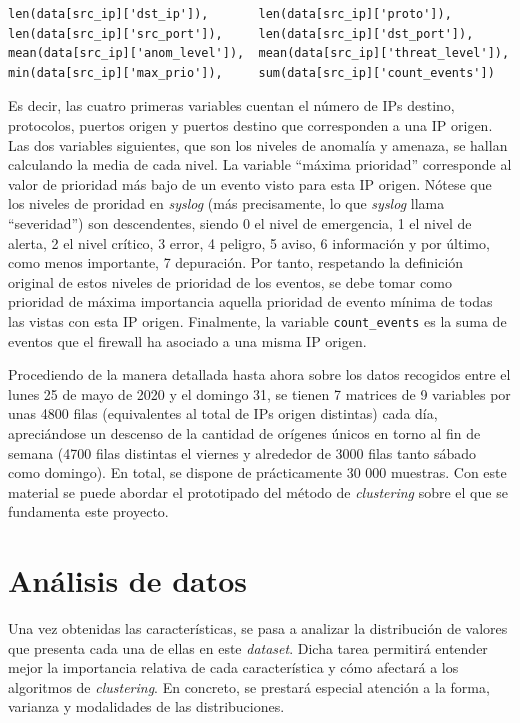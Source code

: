 \begin{verbatim}
len(data[src_ip]['dst_ip']),       len(data[src_ip]['proto']),
len(data[src_ip]['src_port']),     len(data[src_ip]['dst_port']),
mean(data[src_ip]['anom_level']),  mean(data[src_ip]['threat_level']),
min(data[src_ip]['max_prio']),     sum(data[src_ip]['count_events'])
\end{verbatim}

Es decir, las cuatro primeras variables cuentan el número de IPs destino, protocolos, puertos origen y puertos destino que corresponden a una IP origen.
Las dos variables siguientes, que son los niveles de anomalía y amenaza, se hallan calculando la media de cada nivel.
La variable ``máxima prioridad'' corresponde al valor de prioridad más bajo de un evento visto para esta IP origen.
Nótese que los niveles de proridad en \emph{syslog} (más precisamente, lo que \emph{syslog} llama ``severidad'') son descendentes,
siendo 0 el nivel de emergencia, 1 el nivel de alerta, 2 el nivel crítico, 3 error, 4 peligro, 5 aviso, 6 información y por último, como menos importante, 7 depuración.
Por tanto, respetando la definición original de estos niveles de prioridad de los eventos,
se debe tomar como prioridad de máxima importancia aquella prioridad de evento mínima de todas las vistas con esta IP origen.
Finalmente, la variable \texttt{count\_events} es la suma de eventos que el firewall ha asociado a una misma IP origen.

Procediendo de la manera detallada hasta ahora sobre los datos recogidos entre el lunes 25 de mayo de 2020 y el domingo 31,
se tienen 7 matrices de 9 variables por unas 4800 filas (equivalentes al total de IPs origen distintas) cada día,
apreciándose un descenso de la cantidad de orígenes únicos en torno al fin de semana
(4700 filas distintas el viernes y alrededor de 3000 filas tanto sábado como domingo).
En total, se dispone de prácticamente 30 000 muestras.
Con este material se puede abordar el prototipado del método de \emph{clustering} sobre el que se fundamenta este proyecto.

\section{Análisis de datos}\label{sec:analisisdedatos}

Una vez obtenidas las características, se pasa a analizar la distribución de valores que presenta cada una de ellas en este \emph{dataset}.
Dicha tarea permitirá entender mejor la importancia relativa de cada característica y cómo afectará a los algoritmos de \emph{clustering}.
En concreto, se prestará especial atención a la forma, varianza y modalidades de las distribuciones.

